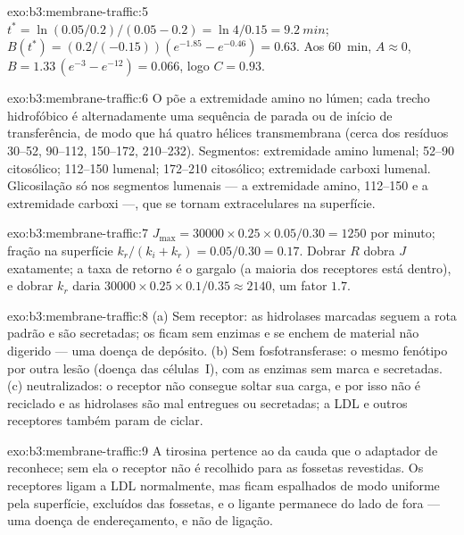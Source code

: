 \begin{solution}{exo:b3:membrane-traffic:5}
$t^{*} = \ln(0.05/0.2)/(0.05 - 0.2) = \ln 4/0.15 = \qty{9.2}{min}$;
$B(t^{*}) = (0.2/(-0.15))(e^{-1.85} - e^{-0.46}) = 0.63$. Aos
\qty{60}{min}, $A \approx 0$, $B = 1.33\,(e^{-3} - e^{-12}) = 0.066$,
logo $C = 0.93$.
\end{solution}

\begin{solution}{exo:b3:membrane-traffic:6}
O  põe a extremidade amino no lúmen; cada trecho
hidrofóbico é alternadamente uma sequência de parada ou de início de
transferência, de modo que há quatro hélices transmembrana (cerca dos
resíduos 30--52, 90--112, 150--172, 210--232). Segmentos: extremidade
amino lumenal; 52--90 citosólico; 112--150 lumenal; 172--210
citosólico; extremidade carboxi lumenal. Glicosilação só nos segmentos
lumenais --- a extremidade amino, 112--150 e a extremidade carboxi ---,
que se tornam extracelulares na superfície.
\end{solution}

\begin{solution}{exo:b3:membrane-traffic:7}
$J_{\max} = \num{30000}\times 0.25\times 0.05/0.30 = 1250$ por minuto;
fração na superfície $k_{r}/(k_{i} + k_{r}) = 0.05/0.30 = 0.17$. Dobrar
$R$ dobra $J$ exatamente; a taxa de retorno é o gargalo (a maioria dos
receptores está dentro), e dobrar $k_{r}$ daria $\num{30000}\times 0.25
\times 0.1/0.35 \approx 2140$, um fator $1.7$.
\end{solution}

\begin{solution}{exo:b3:membrane-traffic:8}
(a) Sem receptor: as hidrolases marcadas seguem a rota padrão e são
secretadas; os  ficam sem enzimas e se enchem de material não
digerido --- uma doença de depósito. (b) Sem fosfotransferase: o mesmo
fenótipo por outra lesão (doença das células~I), com as enzimas sem
marca e secretadas. (c)  neutralizados: o receptor não
consegue soltar sua carga, e por isso não é reciclado e as hidrolases
são mal entregues ou secretadas; a LDL e outros receptores também param
de ciclar.
\end{solution}

\begin{solution}{exo:b3:membrane-traffic:9}
A tirosina pertence ao  da cauda que o adaptador de 
reconhece; sem ela o receptor não é recolhido para as fossetas
revestidas. Os receptores ligam a LDL normalmente, mas ficam espalhados
de modo uniforme pela superfície, excluídos das fossetas, e o ligante
permanece do lado de fora --- uma doença de endereçamento, e não de
ligação.
\end{solution}

